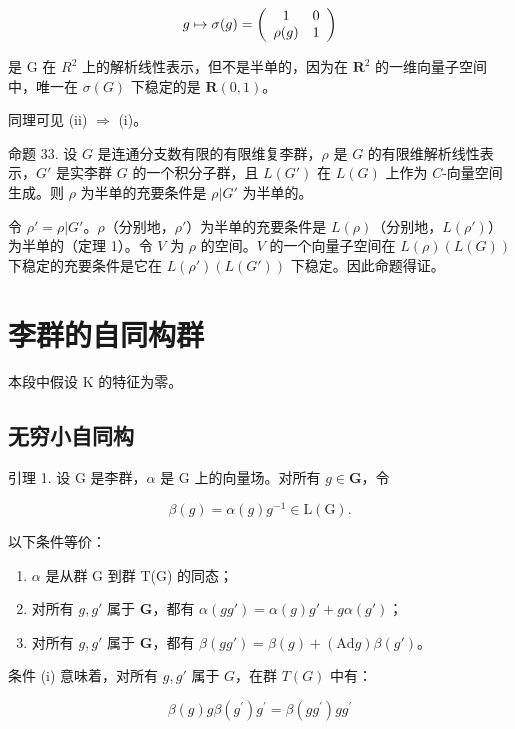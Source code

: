 \[
g \mapsto \sigma (g) = \left( \begin{array}{c c} 1 & 0 \\ \rho (g) & 1 \end{array} \right)
\]

是 G 在 \(R^{2}\) 上的解析线性表示，但不是半单的，因为在 \(\mathbf{R}^2\) 的一维向量子空间中，唯一在 \(\sigma(G)\) 下稳定的是 \(\mathbf{R}(0,1)\)。

同理可见 (ii) \(\Rightarrow\) (i)。

命题 33. 设 \(G\) 是连通分支数有限的有限维复李群，\(\rho\) 是 \(G\) 的有限维解析线性表示，\(G'\) 是实李群 \(G\) 的一个积分子群，且 \(L(G')\) 在 \(L(G)\) 上作为 \(C\)-向量空间生成。则 \(\rho\) 为半单的充要条件是 \(\rho |G'\) 为半单的。

令 \(\rho' = \rho|G'\)。\(\rho\)（分别地，\(\rho'\)）为半单的充要条件是 \(L(\rho)\)（分别地，\(L(\rho')\)）为半单的（定理 1）。令 \(V\) 为 \(\rho\) 的空间。\(V\) 的一个向量子空间在 \(L(\rho)(L(G))\) 下稳定的充要条件是它在 \(L(\rho')(L(G'))\) 下稳定。因此命题得证。

\section{李群的自同构群}

本段中假设 K 的特征为零。

\subsection{无穷小自同构}

引理 1. 设 G 是李群，\(\alpha\) 是 G 上的向量场。对所有 \(g \in \mathbf{G}\)，令

\[
\beta (g) = \alpha (g) g ^ {- 1} \in \mathrm{L} (\mathrm{G}).
\]

以下条件等价：

\begin{enumerate}
\def\labelenumi{(\roman{enumi})}
\item
  \(\alpha\) 是从群 G 到群 T(G) 的同态；
\item
  对所有 \(g, g'\) 属于 \(\mathbf{G}\)，都有 \(\alpha(gg') = \alpha(g)g' + g\alpha(g')\)；
\item
  对所有 \(g, g'\) 属于 \(\mathbf{G}\)，都有 \(\beta(gg') = \beta(g) + (\mathrm{Ad}g)\beta(g')\)。
\end{enumerate}

条件 (i) 意味着，对所有 \(g, g'\) 属于 \(G\)，在群 \(T(G)\) 中有：

\[
\beta (g) g \beta (g ^ {\prime}) g ^ {\prime} = \beta (g g ^ {\prime}) g g ^ {\prime}
\]

